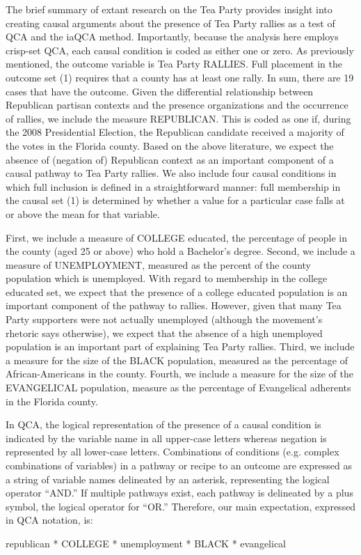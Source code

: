 \documentclass[]{article}
\begin{document}
{The brief summary of extant research on the Tea Party provides insight into creating causal arguments about the presence of Tea Party rallies as a test of QCA and the iaQCA method. Importantly, because the analysis here employs crisp-set QCA, each causal condition is coded as either one or zero. As previously mentioned, the outcome variable is Tea Party RALLIES. Full placement in the outcome set (1) requires that a county has at least one rally. In sum, there are 19 cases that have the outcome. Given the differential relationship between Republican partisan contexts and the presence organizations and the occurrence of rallies, we include the measure REPUBLICAN. This is coded as one if, during the 2008 Presidential Election, the Republican candidate received a majority of the votes in the Florida county. Based on the above literature, we expect the absence of (negation of) Republican context as an important component of a causal pathway to Tea Party rallies. We also include four causal conditions in which full inclusion is defined in a straightforward manner: full membership in the causal set (1) is determined by whether a value for a particular case falls at or above the mean for that variable. 

First, we include a measure of COLLEGE educated, the percentage of people in the county (aged 25 or above) who hold a Bachelor's degree. Second, we include a measure of UNEMPLOYMENT, measured as the percent of the county population which is unemployed. With regard to membership in the college educated set, we expect that the presence of a college educated population is an important component of the pathway to rallies. However, given that many Tea Party supporters were not actually unemployed (although the movement's rhetoric says otherwise), we expect that the absence of a high unemployed population is an important part of explaining Tea Party rallies. Third, we include a measure for the size of the BLACK population, measured as the percentage of African-Americans in the county. Fourth, we include a measure for the size of the EVANGELICAL population, measure as the percentage of Evangelical adherents in the Florida county. 

In QCA, the logical representation of the presence of a causal condition is indicated by the variable name in all upper-case letters whereas negation is represented by all lower-case letters. Combinations of conditions (e.g. complex combinations of variables) in a pathway or recipe to an outcome are expressed as a string of variable names delineated by an asterisk, representing the logical operator ``AND.'' If multiple pathways exist, each pathway is delineated by a plus symbol, the logical operator for ``OR.'' Therefore, our main expectation, expressed in QCA notation, is:
\begin{center}
republican * COLLEGE * unemployment * BLACK * evangelical
\end{center}

}
\end{document}
